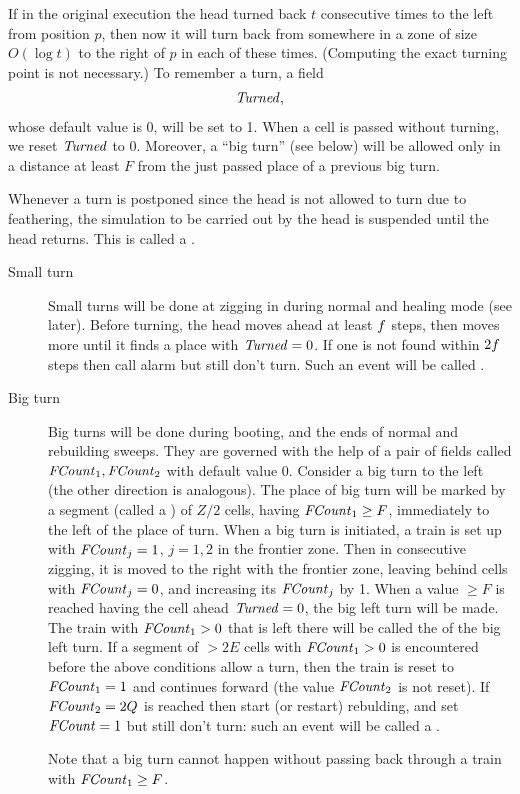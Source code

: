 \documentclass[11pt]{memoir}
\theoremstyle{definition} %
\renewcommand{\ge}{\geq}
\newcommand{\fld}[1]{\ensuremath{\textit{#1\/}}}
\newcommand{\E}{E} %
\newcommand{\F}{F}
\newcommand{\Q}{Q} %
\newcommand{\Z}{Z} %
\newcommand{\Turned}{\fld{Turned}} %
\newcommand{\FCount}{\fld{FCount}} %
\begin{document}
If in the original execution the head turned back \( t \) consecutive
times to the left from position \( p \), then now it will 
turn back from somewhere in a zone of size \( O(\log t) \) to the right of \( p \) in 
each of these times.
(Computing the exact turning point is not necessary.)
To remember a turn, a field
\begin{align*}
 \Turned,
\end{align*}
whose default value is 0, will be set to 1.
When a cell is passed without turning, we reset \( \Turned \) to 0.
Moreover, a ``big turn'' (see below)
will be allowed only in a distance at least \( \F \) from the just passed place of a previous
big turn.

\begin{definition}[Digression]\label{def:digression}
Whenever a turn is postponed since the head is not allowed to turn due to feathering,
the simulation to be carried out by the head is suspended until the head returns.
This is called a .
\end{definition}

\begin{description}
\item[Small turn]
  Small turns will be done at zigging in during normal and healing mode (see later).
  Before turning, the head moves ahead at least \( f \) steps, then moves more until it finds a
  place with \( \Turned=0 \).
  If one is not found within \( 2f \) steps then call alarm but still don't turn.
  Such an event will be called .

\item[Big turn]
  Big turns will be done during booting, and the ends of normal and rebuilding sweeps.
  They are governed with the help of a pair of fields
  called \( \FCount_{1},\FCount_{2} \) with default value 0.
Consider a big turn to the left (the other direction is analogous).
The place of big turn will be marked by a segment (called a )
of  \( \Z/2 \) cells, having \( \FCount_{1}\ge\F \),
immediately to the left of the place of turn.
When a big turn is initiated, a train is set up with \( \FCount_{j}= 1 \), \( j=1,2 \) in the frontier zone.
Then in consecutive zigging, it is moved to the right with the frontier zone,
leaving behind cells with \( \FCount_{j}=0 \), and increasing its \( \FCount_{j} \) by 1.
When a value \( \ge\F \) is reached having the cell ahead \( \Turned=0 \),
the big left turn will be made.
The train with \( \FCount_{1}>0 \) that is left there will be called the  of the big left turn.
If a segment of \( >2\E \) cells with \( \FCount_{1}>0 \)
is encountered before the above conditions allow a turn,
then the train is reset to \( \FCount_{1}= 1 \) and continues forward (the value \( \FCount_{2} \) is not reset).
If \( \FCount_{2}=2\Q \) is reached then start (or restart) rebulding, and set \( \FCount=1 \) but still don't turn:
such an event will be called a .

Note that a big turn cannot happen without passing back through a train with \( \FCount_{1}\ge\F \).
\end{description}
\end{document}
